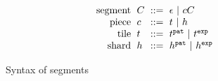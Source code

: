 \begin{figure}
\[\arraycolsep=3pt\begin{array}{rlrl}
  \text{segment} & \selection & ::= & \emptyseg ~\vert~ \selem\selection \\
  \text{piece} & \selem & ::= &
    \tile ~\vert~
    \shard \\

  \text{tile} & \tile & ::= &
      \tile^{\pat} ~\vert~
      \tile^{\expr} \\

  \text{shard} & \shard & ::= &
    \shard^{\pat} ~\vert~
    \shard^{\expr}
\end{array}\]
\caption{
  Syntax of segments
}
\label{fig:segment-syntax}
\end{figure}